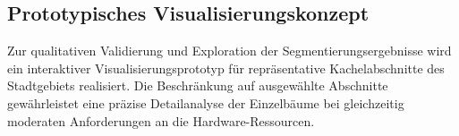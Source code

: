 \subsection{Prototypisches Visualisierungskonzept}

Zur qualitativen Validierung und Exploration der Segmentierungsergebnisse wird ein interaktiver Visualisierungsprototyp für repräsentative Kachelabschnitte des Stadtgebiets realisiert. Die Beschränkung auf ausgewählte Abschnitte gewährleistet eine präzise Detailanalyse der Einzelbäume bei gleichzeitig moderaten Anforderungen an die Hardware-Ressourcen.